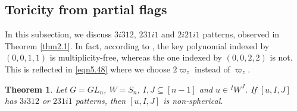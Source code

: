 \documentclass[12pt]{amsart}
\newtheorem{theorem}{Theorem}[section]
\theoremstyle{definition}
\theoremstyle{remark}
\begin{document}
\subsection{Toricity from partial flags}

In this subsection, we discuss $3i312$, $231i1$ and $2i21i1$ patterns, observed in Theorem \ref{thm2.1}. In fact, according to \cite[Theorem 1.1]{MR4599567}, the key polynomial indexed by $(0,0,1,1)$ is multiplicity-free, whereas the one indexed by $(0,0,2,2)$ is not. This is reflected in \eqref{eqn5.48} where we choose $2 \varpi_z$ instead of $\varpi_z$.

\begin{theorem}\label{thm5.3}
Let $G= GL_n$, $W=S_n$, $I, J \subseteq [n-1]$ and $u \in {}^I W^J$. If $[u,I,J]$ has $3i312$ or $231i1$ patterns, then $[u,I,J]$ is non-spherical.
\end{theorem}
\end{document}
